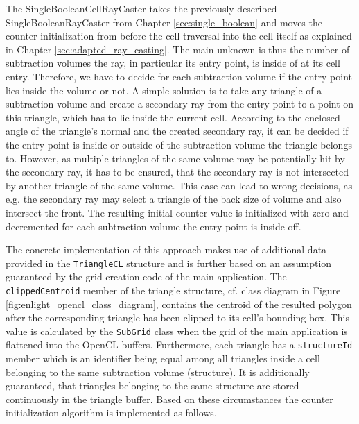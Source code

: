 The SingleBooleanCellRayCaster takes the previously described SingleBooleanRayCaster from Chapter \ref{sec:single_boolean} and moves the counter initialization from before the cell traversal into the cell itself as explained in Chapter \ref{sec:adapted_ray_casting}. The main unknown is thus the number of subtraction volumes the ray, in particular its entry point, is inside of at its cell entry. Therefore, we have to decide for each subtraction volume if the entry point lies inside the volume or not. A simple solution is to take any triangle of a subtraction volume and create a secondary ray from the entry point to a point on this triangle, which has to lie inside the current cell. According to the enclosed angle of the triangle's normal and the created secondary ray, it can be decided if the entry point is inside or outside of the subtraction volume the triangle belongs to. However, as multiple triangles of the same volume may be potentially hit by the secondary ray, it has to be ensured, that the secondary ray is not intersected by another triangle of the same volume. This case can lead to wrong decisions, as e.g. the secondary ray may select a triangle of the back size of volume and also intersect the front. The resulting initial counter value is initialized with zero and decremented for each subtraction volume the entry point is inside off.

The concrete implementation of this approach makes use of additional data provided in the \lstinline!TriangleCL! structure and is further based on an assumption guaranteed by the grid creation code of the main application. The \lstinline!clippedCentroid! member of the triangle structure, cf. class diagram in Figure \ref{fig:enlight_opencl_class_diagram}, contains the centroid of the resulted polygon after the corresponding triangle has been clipped to its cell's bounding box. This value is calculated by the \lstinline!SubGrid! class when the grid of the main application is flattened into the OpenCL buffers. Furthermore, each triangle has a \lstinline!structureId! member which is an identifier being equal among all triangles inside a cell belonging to the same subtraction volume (structure). It is additionally guaranteed, that triangles belonging to the same structure are stored continuously in the triangle buffer. Based on these circumstances the counter initialization algorithm is implemented as follows.

